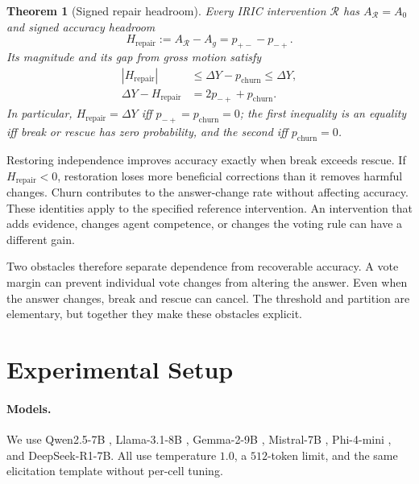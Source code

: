 \documentclass[11pt,a4paper]{article}
\newtheorem{theorem}{Theorem}
\theoremstyle{definition}
\newcommand{\Hrep}{H_{\mathrm{repair}}}
\newcommand{\pbreak}{p_{+-}}
\newcommand{\prescue}{p_{-+}}
\newcommand{\pchurn}{p_{\mathrm{churn}}}
\begin{document}
\begin{theorem}[Signed repair headroom]
\label{thm:headroom}
Every IRIC intervention $\mathcal R$ has $A_{\mathcal R}=A_0$ and signed
accuracy headroom
\begin{equation}
\Hrep:=A_{\mathcal R}-A_g=\pbreak-\prescue.
\label{eq:main-headroom}
\end{equation}
Its magnitude and its gap from gross motion satisfy
\begin{equation}
\begin{aligned}
|\Hrep|&\le\Delta Y-\pchurn\le\Delta Y,\\
\Delta Y-\Hrep&=2\prescue+\pchurn.
\end{aligned}
\label{eq:residual}
\end{equation}
In particular, $\Hrep=\Delta Y$ iff $\prescue=\pchurn=0$; the first
inequality is an equality iff break or rescue has zero probability, and
the second iff $\pchurn=0$.
\end{theorem}

Restoring independence improves accuracy exactly when break exceeds rescue.
If $\Hrep<0$, restoration loses more beneficial corrections than it removes
harmful changes. Churn contributes to the answer-change rate without affecting
accuracy. These identities apply to the specified reference intervention.
An intervention that adds evidence, changes agent competence, or changes the
voting rule can have a different gain.

Two obstacles therefore separate dependence from recoverable accuracy.
A vote margin can prevent individual vote changes from altering the answer.
Even when the answer changes, break and rescue can cancel. The threshold
and partition are elementary, but together they make these obstacles explicit.

\section{Experimental Setup}
\label{sec:experimental-setup}

\paragraph{Models.}
We use Qwen2.5-7B \citep{qwen-2024-qwen25}, Llama-3.1-8B \citep{grattafiori-etal-2024-llama3}, Gemma-2-9B \citep{gemma-2024-gemma2}, Mistral-7B \citep{jiang-etal-2023-mistral}, Phi-4-mini \citep{abouelenin-etal-2025-phi4mini}, and DeepSeek-R1-7B.
All use temperature $1.0$, a $512$-token limit, and the same elicitation template without per-cell tuning.
\end{document}
